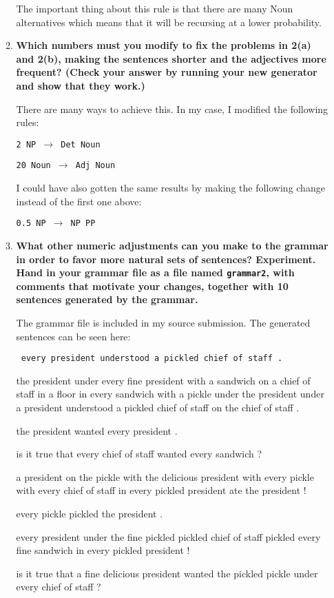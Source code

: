 \documentclass[10pt]{article}
\begin{document}
\begin{enumerate}
\begin{enumerate}
The important thing about this rule is that there are many Noun alternatives which means that it will be recursing at a lower probability.

\item {\bf Which numbers must you modify to fix the problems in 2(a) and
    2(b), making the sentences shorter and the adjectives more
    frequent? (Check your answer by running your new generator and
    show that they work.)}

There are many ways to achieve this. In my case, I modified the following rules:

{\tt 2 NP $\rightarrow$ Det Noun}

{\tt 20 Noun $\rightarrow$ Adj Noun}

I could have also gotten the same results by making the following change instead of the first one above:

{\tt 0.5 NP $\rightarrow$ NP PP}

\item {\bf What other numeric adjustments can you make to the grammar in
  order to favor more natural sets of sentences? Experiment. Hand in
  your grammar file as a file named \verb+grammar2+, with comments that
  motivate your changes, together with 10 sentences generated by the
  grammar.}

The grammar file is included in my source submission. The generated sentences can be seen here:

{\tt
every president understood a pickled chief of staff .

the president under every fine president with a sandwich on a chief of staff in a floor in every sandwich with a pickle under the president under a president understood a pickled chief of staff on the chief of staff .

the president wanted every president .

is it true that every chief of staff wanted every sandwich ?

a president on the pickle with the delicious president with every pickle with every chief of staff in every pickled president ate the president !

every pickle pickled the president .

every president under the fine pickled pickled chief of staff pickled every fine sandwich in every pickled president !

is it true that a fine delicious president wanted the pickled pickle under every chief of staff ?

}
\end{enumerate}
\end{enumerate}
\end{document}
